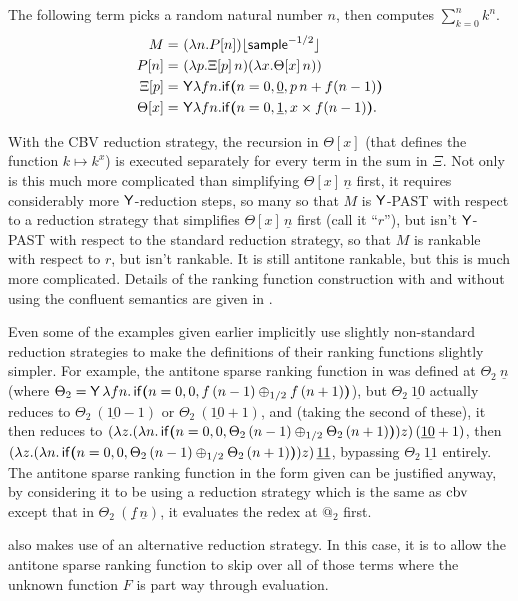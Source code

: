 \begin{example} \label{ex:sum of powers}
The following term picks a random natural number $n$, then computes $\sum_{k=0}^n k^n$.
\begin{align*}
M =&\ (\lambda n. P[n]) \lfloor \mathsf{sample}^{-1/2} \rfloor \\
P[n] =&\ (\lambda p. \Xi[p] \, n) (\lambda x. \Theta[x] \, n)) \\
\Xi[p] =&\ \mathsf{Y} \lambda f n. \mathsf{if}\boldsymbol{(}n = 0, \underline 0, p \, n + f (n-1)\boldsymbol{)} \\
\Theta[x] =&\ \mathsf{Y} \lambda f n. \mathsf{if}\boldsymbol{(}n = 0, \underline 1, x \times f (n-1)\boldsymbol{)}.
\end{align*}

With the CBV reduction strategy, the recursion in $\Theta[x]$ (that defines the function $k \mapsto k^x$) is executed separately for every term in the sum in $\Xi$. Not only is this much more complicated than simplifying $\Theta[x] \, \underline n$ first, it requires considerably more $\mathsf{Y}$-reduction steps, so many so that $M$ is $\mathsf{Y}$-PAST with respect to a reduction strategy that simplifies $\Theta[x] \, \underline n$ first (call it ``$r$''), but isn't $\mathsf{Y}$-PAST with respect to the standard reduction strategy, so that $M$ is rankable with respect to $r$, but isn't rankable. It is still antitone rankable, but this is much more complicated. Details of the ranking function construction with and without using the confluent semantics are given in .
\end{example}

Even some of the examples given earlier implicitly use slightly non-standard reduction strategies to make the definitions of their ranking functions slightly simpler. For example, the antitone sparse ranking function in  was defined at $\Theta_2\ \underline n$ (where $\Theta_2 = \mathsf{Y} \, \lambda f n . \, \mathsf{if}\boldsymbol{(}n = 0, 0, f \, (n - 1) \oplus_{1/2} f \, (n + 1)\boldsymbol{)}$), but $\Theta_2\ \underline{10}$ actually reduces to $\Theta_2\ (\underline{10} - 1)$ or $\Theta_2\ (\underline{10} + 1)$, and (taking the second of these), it then reduces to $(\lambda z. (\lambda n. \, \mathsf{if}\boldsymbol{(}n = 0, 0, \Theta_2 \, (n - 1) \oplus_{1/2} \Theta_2 \, (n + 1)\boldsymbol{)}) z) \, (\underline{10} + 1)$, then $(\lambda z. (\lambda n. \, \mathsf{if}\boldsymbol{(}n = 0, 0, \Theta_2 \, (n - 1) \oplus_{1/2} \Theta_2 \, (n + 1)\boldsymbol{)}) z) \, \underline{11}$, bypassing $\Theta_2\ \underline{11}$ entirely. The antitone sparse ranking function in the form given can be justified anyway, by considering it to be using a reduction strategy which is the same as $\operatorname{cbv}$ except that in $\Theta_2\ (\underline f \, \underline n)$, it evaluates the redex at $@_2$ first.

 also makes use of an alternative reduction strategy. In this case, it is to allow the antitone sparse ranking function to skip over all of those terms where the unknown function $F$ is part way through evaluation.
